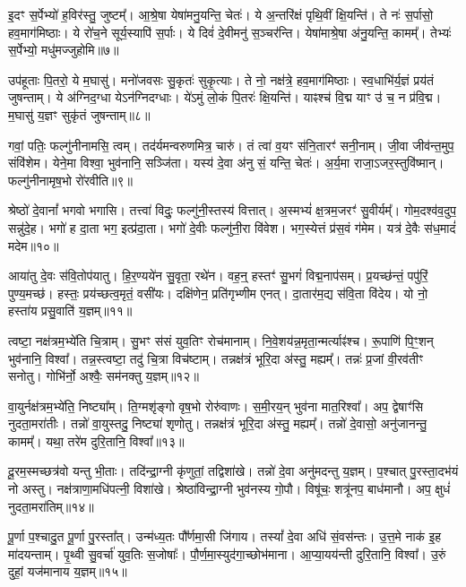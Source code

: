 इ॒दꣳ स॒र्पेभ्यो॑ ह॒विर॑स्तु॒ जुष्टम्᳚।
आ॒श्रे॒षा येषा॑मनु॒यन्ति॒ चेतः॑।
ये अ॒न्तरि॑क्षं पृथि॒वीं क्षि॒यन्ति॑।
ते नः॑ स॒र्पासो॒ हव॒माग॑मिष्ठाः।
ये रो॑च॒ने सूर्य॒स्यापि॑ स॒र्पाः।
ये दिवं॑ दे॒वीमनु॑ स॒ञ्चर॑न्ति।
येषा॑माश्रे॒षा अ॑नु॒यन्ति॒ कामम्᳚।
तेभ्यः॑ स॒र्पेभ्यो॒ मधु॑मज्जुहोमि॥७॥ 

उप॑हूताः पि॒तरो॒ ये म॒घासु॑।
मनो॑जवसः सु॒कृतः॑ सुकृ॒त्याः।
ते नो॒ नक्ष॑त्रे॒ हव॒माग॑मिष्ठाः।
स्व॒धाभि॑र्य॒ज्ञं प्रय॑तं जुषन्ताम्।
ये अ॑ग्निद॒ग्धा येऽन॑ग्निदग्धाः।
ये॑ऽमुं लो॒कं पि॒तरः॑ क्षि॒यन्ति॑।
याꣴश्च॑ वि॒द्म याꣳ उ॑ च॒ न प्र॑वि॒द्म।
म॒घासु॑ य॒ज्ञꣳ सुकृ॑तं जुषन्ताम्॥८॥ 

गवां॒ पतिः॒ फल्गु॑नीनामसि॒ त्वम्।
तद॑र्यमन्वरुणमित्र॒ चारु॑।
तं त्वा॑ व॒यꣳ स॑नि॒तारꣳ॑ सनी॒नाम्।
जी॒वा जीव॑न्त॒मुप॒ संवि॑शेम।
येने॒मा विश्वा॒ भुव॑नानि॒ सञ्जि॑ता।
यस्य॑ दे॒वा अ॑नु सं॒ यन्ति॒ चेतः॑।
अ॒र्य॒मा राजा॒\-ऽजर॒स्तुवि॑ष्मान्।
फल्गु॑नीनामृष॒भो रो॑रवीति॥९॥ 

श्रेष्ठो॑ दे॒वानां᳚ भगवो भगासि।
तत्त्वा॑ विदुः॒ फल्गु॑नी॒स्तस्य॑ वित्तात्।
अ॒स्मभ्यं॑ क्ष॒त्रम॒जरꣳ॑ सु॒वीर्यम्᳚।
गोम॒दश्व॑व॒दुप॒ सन्नु॑\-दे॒ह।
भगो॑ ह दा॒ता भग॒ इत्प्र॑दा॒ता।
भगो॑ दे॒वीः फल्गु॑नी॒रा वि॑वेश।
भग॒स्येत्तं प्र॑स॒वं ग॑मेम।
यत्र॑ दे॒वैः स॑ध॒मादं॑ मदेम॥१०॥ 

आया॑तु दे॒वः स॑वि॒तोप॑यातु।
हि॒र॒ण्यये॑न सु॒वृता॒ रथे॑न।
वह॒न्॒ हस्तꣳ॑ सु॒भगं॑ विद्म॒नाप॑सम्।
प्र॒यच्छ॑न्तं॒ पपु॑रिं॒ पुण्य॒मच्छ॑।
हस्तः॒ प्रय॑च्छत्व॒मृतं॒ वसी॑यः।
दक्षि॑णेन॒ प्रति॑गृभ्णीम एनत्।
दा॒तार॑म॒द्य स॑वि॒ता वि॑देय।
यो नो॒ हस्ता॑य प्रसु॒वाति॑ य॒ज्ञम्॥११॥ 

त्वष्टा॒ नक्ष॑त्रम॒भ्ये॑ति चि॒त्राम्।
सु॒भꣳ स॑सं युव॒तिꣳ रोच॑मानाम्।
नि॒वे॒शय॑न्न॒\-मृता॒न्मर्त्याꣴ॑श्च।
रू॒पाणि॑ पि॒ꣳ॒शन् भुव॑नानि॒ विश्वा᳚।
तन्न॒स्त्वष्टा॒ तदु॑ चि॒त्रा विच॑ष्टाम्।
तन्नक्ष॑त्रं भूरि॒दा अ॑स्तु॒ मह्यम्᳚।
तन्नः॑ प्र॒जां वी॒रव॑तीꣳ सनोतु।
गोभि॑र्नो॒ अश्वैः॒ सम॑नक्तु य॒ज्ञम्॥१२॥ 

वा॒युर्नक्ष॑त्रम॒भ्ये॑ति॒ निष्ट्या᳚म्।
ति॒ग्मशृ॑ङ्गो वृष॒भो रोरु॑वाणः।
स॒मी॒रय॒न् भुव॑ना मात॒रिश्वा᳚।
अप॒ द्वेषाꣳ॑सि नुदता॒मरा॑तीः।
तन्नो॑ वा॒युस्तदु॒ निष्ट्या॑ शृणोतु।
तन्नक्ष॑त्रं भूरि॒दा अ॑स्तु॒ मह्यम्᳚।
तन्नो॑ दे॒वासो॒ अनु॑जानन्तु॒ कामम्᳚।
यथा॒ तरे॑म दुरि॒तानि॒ विश्वा᳚॥१३॥ 

दू॒रम॒स्मच्छत्र॑वो यन्तु भी॒ताः।
तदि॑न्द्रा॒ग्नी कृ॑णुतां॒ तद्विशा॑खे।
तन्नो॑ दे॒वा अनु॑मदन्तु य॒ज्ञम्।
प॒श्चात् पु॒रस्ता॒दभ॑यं नो अस्तु।
नक्ष॑त्राणा॒मधि॑पत्नी॒ विशा॑खे।
श्रेष्ठा॑विन्द्रा॒ग्नी भुव॑नस्य गो॒पौ।
विषू॑चः॒ शत्रू॑नप॒ बाध॑मानौ।
अप॒ क्षुधं॑ नुदता॒मरा॑तिम्॥१४॥ 

पू॒र्णा प॒श्चादु॒त पू॒र्णा पु॒रस्ता᳚त्।
उन्म॑ध्य॒तः पौ᳚र्णमा॒सी जि॑गाय।
तस्यां᳚ दे॒वा अधि॑ सं॒वस॑न्तः।
उ॒त्त॒मे नाक॑ इ॒ह मा॑दयन्ताम्।
पृ॒थ्वी सु॒वर्चा॑ युव॒तिः स॒जोषाः᳚।
पौ॒र्ण॒मा॒स्युद॑गा॒च्छोभ॑माना।
आ॒प्या॒यय॑न्ती दुरि॒तानि॒ विश्वा᳚।
उ॒रुं दुहां॒ यज॑मानाय य॒ज्ञम्॥१५॥ 

